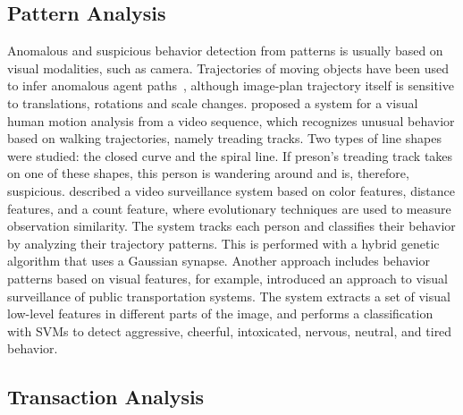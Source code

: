 \subsection{Pattern Analysis}
Anomalous and suspicious behavior detection from patterns is usually based on visual modalities, such as camera. Trajectories of moving objects have been used to infer anomalous agent paths~\citep{Zhang2004,Vaswani}, although image-plan trajectory itself is sensitive to translations, rotations and scale changes. \citet{Zhang2007} proposed a system for a visual human motion analysis from a video sequence, which recognizes unusual behavior based on  walking trajectories, namely treading tracks. Two types of line shapes were studied: the closed curve and the spiral line. If preson's treading track takes on one of these shapes, this person is wandering around and is, therefore, suspicious. \citet{Lin2008} described a video surveillance system based on color features, distance features, and a count feature, where evolutionary techniques are used to measure observation similarity. The system tracks each person and classifies their behavior by analyzing their trajectory patterns. This is performed with a hybrid genetic algorithm that uses a Gaussian synapse. Another approach includes behavior patterns based on visual features, for example, \cite{Arsic} introduced an approach to visual surveillance of public transportation systems. The system extracts a set of visual low-level features in different parts of the image, and performs a classification with SVMs to detect aggressive, cheerful, intoxicated, nervous, neutral, and tired behavior.



\subsection{Transaction Analysis}
\label{related:behavior:transaction}

